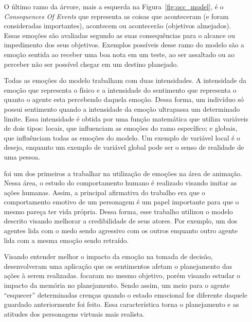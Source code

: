 O último ramo da árvore, mais a esquerda na Figura~\ref{fig:occ_model}, é o
\emph{Consequences Of Events} que representa as coisas que aconteceram (e
foram consideradas importantes), acontecem ou acontecerão (objetivos
almejados)\dev{}. Essas emoções são avaliadas segundo as suas consequências
para o alcance ou impedimento dos seus objetivos. Exemplos possíveis desse
ramo do modelo são a emoção sentida ao receber uma boa nota em um teste, ao
ser assaltado ou ao perceber não ser possível chegar em um destino planejado.

Todas as emoções do modelo trabalham com duas intensidades. A intensidade da
emoção que representa o físico e a intensidade do sentimento que representa o
quanto o agente esta percebendo daquela emoção. Dessa forma, um indivíduo só
possui sentimento quando a intensidade da emoção ultrapassa um
determinado limite\dev{}.  Essa intensidade é obtida por uma função matemática
que utiliza variáveis de dois tipos: locais, que influenciam as emoções do ramo
específico; e globais, que influênciam todas as emoções do modelo.  Um exemplo
de variável local é o desejo, enquanto um exemplo de variável global pode ser
o senso de realidade de uma pessoa.

\citet{bates1994role} foi um dos primeiros a trabalhar na utilização de emoções
na área de animação. Nessa área, o estudo do comportamento humano é realizado
visando imitar as ações humanas. Assim, a principal afirmativa do trabalho era
que o comportamento emotivo de um personagem é um papel importante para que o
mesmo pareça ter vida própria. Dessa forma, esse trabalho utilizou o modelo
descrito visando melhorar a credibilidade de seus atores. Por exemplo, um dos
agentes lida com o medo sendo agressivo com os outros enquanto outro agente
lida com a mesma emoção sendo retraído.


Visando entender melhor o impacto da emoção na tomada de decisão,
\citet{zhang2009emotional} desenvolveram uma aplicação que os sentimentos
afetam o planejamento das ações à serem realizadas.
\citet{neto2010construction} focaram no mesmo objetivo, porém visando estudar
o impacto da memória no planejamento. Sendo assim, um meio para o agente
``esquecer'' determinadas crenças quando o estado emocional for diferente
daquele guardado anteriormente foi feito. Essa característica torna o
planejamento e as atitudes dos personagens virtuais mais realista.

